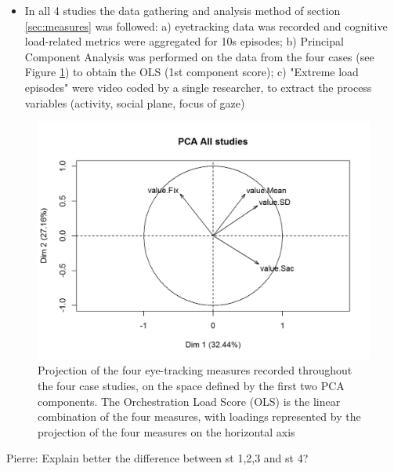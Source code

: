 \documentclass[10pt,journal,compsoc]{IEEEtran}
\begin{document}
\begin{itemize}
\item In all 4 studies the data gathering and analysis method of section \ref{sec:measures} was followed: a) eyetracking data was recorded and cognitive load-related metrics were aggregated for 10s episodes; b) Principal Component Analysis was performed on the data from the four cases (see Figure \ref{fig:pca}) to obtain the OLS (1st component score); c) "Extreme load episodes" were video coded by a single researcher, to extract the process variables (activity, social plane, focus of gaze) 
\end{itemize}

\begin{figure}[!t]
\centering
\includegraphics[width=\linewidth]{img/PCA.png}
\caption{Projection of the four eye-tracking measures recorded throughout the four case studies, on the space defined by the first two PCA components. The Orchestration Load Score (OLS) is the linear combination of the four measures, with loadings represented by the projection of the four measures on the horizontal axis}
\label{fig:pca}
\end{figure}

Pierre: Explain better the difference between st 1,2,3 and st 4?
\end{document}
